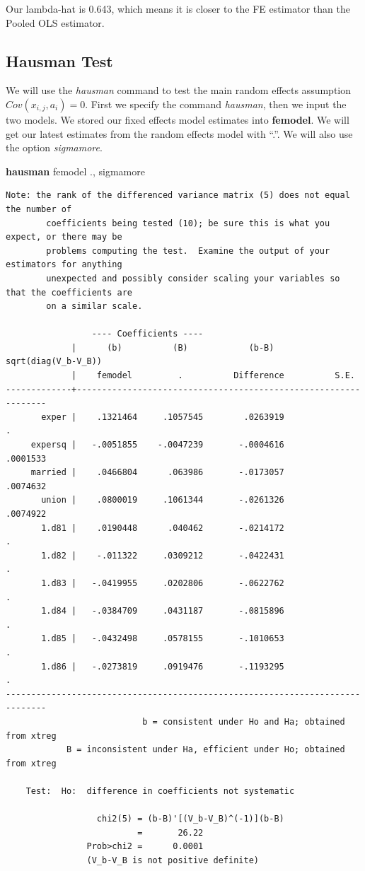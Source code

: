 \documentclass[
]{book}
\newenvironment{Shaded}{\begin{snugshade}}{\end{snugshade}}
\newcommand{\KeywordTok}[1]{\textcolor[rgb]{0.13,0.29,0.53}{\textbf{#1}}}
\newcommand{\NormalTok}[1]{#1}
\begin{document}
Our lambda-hat is 0.643, which means it is closer to the FE estimator than the Pooled OLS estimator.

\subsection*{Hausman Test}\label{hausman-test}

We will use the \emph{hausman} command to test the main random effects assumption \(Cov(x_{i,j},a_i)=0\). First we specify the command \emph{hausman}, then we input the two models. We stored our fixed effects model estimates into \textbf{femodel}. We will get our latest estimates from the random effects model with ``.''. We will also use the option \emph{sigmamore}.

\begin{Shaded}
\begin{Highlighting}[]
\KeywordTok{hausman}\NormalTok{ femodel ., sigmamore}
\end{Highlighting}
\end{Shaded}

\begin{verbatim}
Note: the rank of the differenced variance matrix (5) does not equal the number of
        coefficients being tested (10); be sure this is what you expect, or there may be
        problems computing the test.  Examine the output of your estimators for anything
        unexpected and possibly consider scaling your variables so that the coefficients are
        on a similar scale.

                 ---- Coefficients ----
             |      (b)          (B)            (b-B)     sqrt(diag(V_b-V_B))
             |    femodel         .          Difference          S.E.
-------------+----------------------------------------------------------------
       exper |    .1321464     .1057545        .0263919               .
     expersq |   -.0051855    -.0047239       -.0004616        .0001533
     married |    .0466804      .063986       -.0173057        .0074632
       union |    .0800019     .1061344       -.0261326        .0074922
       1.d81 |    .0190448      .040462       -.0214172               .
       1.d82 |    -.011322     .0309212       -.0422431               .
       1.d83 |   -.0419955     .0202806       -.0622762               .
       1.d84 |   -.0384709     .0431187       -.0815896               .
       1.d85 |   -.0432498     .0578155       -.1010653               .
       1.d86 |   -.0273819     .0919476       -.1193295               .
------------------------------------------------------------------------------
                           b = consistent under Ho and Ha; obtained from xtreg
            B = inconsistent under Ha, efficient under Ho; obtained from xtreg

    Test:  Ho:  difference in coefficients not systematic

                  chi2(5) = (b-B)'[(V_b-V_B)^(-1)](b-B)
                          =       26.22
                Prob>chi2 =      0.0001
                (V_b-V_B is not positive definite)
\end{verbatim}
\end{document}
